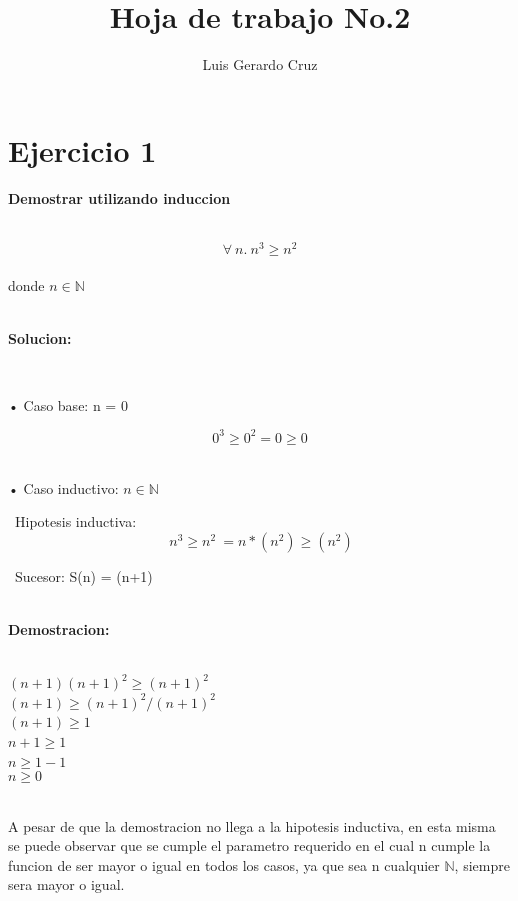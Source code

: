 \documentclass[10pt,a4paper]{article}
\begin{document}
\title{Hoja de trabajo No.2}\large
\author{Luis Gerardo Cruz}
\maketitle
\section*{Ejercicio 1}
\begin{large}
\textbf{Demostrar utilizando induccion}
\end{large} 
\ \[
        \forall\ n.\ n^3\geq n^2
\]
\\donde $n\in\mathbb{N}$

\
\\\textbf{Solucion:}

\ \begin{flushleft}
• Caso base: n = 0
\end{flushleft}

\[
0^{3}\geq0^{2}= 0\geq0
\]
\ \begin{flushleft}
• Caso inductivo: $n\in\mathbb{N}$
\end{flushleft}

\ Hipotesis inductiva: \[
        \ n^3\geq n^2 \ = n*(n^2)\geq (n^2)
\]

\ Sucesor: S(n) = (n+1) 

\
\\\textbf{Demostracion:}

\
\\ $ (n+1)(n+1)^2\geq (n+1)^2 $ 
\
\\ $ (n+1)\geq (n+1)^2/(n+1)^2 $
\
\\ $ (n+1)\geq 1$
\
\\ $ n+1\geq 1 $
\
\\ $ n\geq 1-1 $
\
\\ $ n\geq 0 $ 

\
\\ A pesar de que la demostracion no llega a la hipotesis inductiva, en esta misma se puede observar que se cumple el parametro requerido en el cual n cumple la funcion de ser mayor o igual en todos los casos, ya que sea n cualquier $ \mathbb{N}$, siempre sera mayor o igual. 
\end{document}
